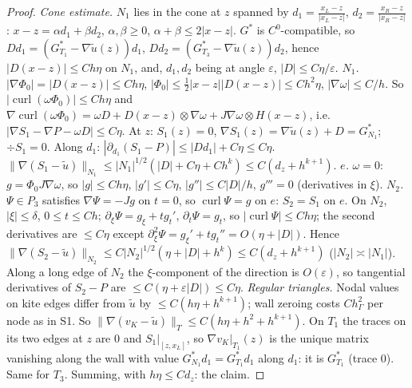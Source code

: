 \documentclass[11pt]{article}
\theoremstyle{remark}
\newcommand{\hG}{h_\Gamma}
\newcommand{\norm}[1]{\|#1\|}
\newcommand{\curl}{\operatorname{curl}}
\begin{document}
\begin{proof}
\emph{Cone estimate.} $N_1$ lies in the cone at $z$ spanned by $d_1=\frac{x_L-z}{|x_L-z|}$, $d_2=\frac{x_R-z}{|x_R-z|}$: $x-z=\alpha d_1+\beta d_2$, $\alpha,\beta\ge0$, $\alpha+\beta\le2|x-z|$.
$G^*$ is $C^0$-compatible, so $Dd_1=(G^*_{T_1}-\nabla\tilde u(z))d_1$, $Dd_2=(G^*_{T_3}-\nabla\tilde u(z))d_2$, hence $|D(x-z)|\le Ch\eta$ on $N_1$, and, $d_1,d_2$ being at angle
$\varepsilon$, $|D|\le C\eta/\varepsilon$.
\emph{$N_1$.} $|\nabla\Phi_0|=|D(x-z)|\le Ch\eta$, $|\Phi_0|\le\frac12|x-z||D(x-z)|\le Ch^2\eta$, $|\nabla\omega|\le C/h$. So
$|\curl(\omega\Phi_0)|\le Ch\eta$ and $\nabla\curl(\omega\Phi_0)=\omega D+D(x-z)\otimes\nabla\omega+J\nabla\omega\otimes H(x-z)$, i.e. $|\nabla S_1-\nabla P-\omega D|\le C\eta$.
At $z$: $S_1(z)=0$, $\nabla S_1(z)=\nabla\tilde u(z)+D=G^*_{N_1}$; $\div S_1=0$. Along $d_1$: $|\partial_{d_1}(S_1-P)|\le|Dd_1|+C\eta\le C\eta$.
$\norm{\nabla(S_1-\tilde u)}_{N_1}\le|N_1|^{1/2}(|D|+C\eta+Ch^k)\le C(d_z+h^{k+1})$.
\emph{$e$.} $\omega=0$: $g=\Phi_0J\nabla\omega$, so $|g|\le Ch\eta$, $|g'|\le C\eta$, $|g''|\le C|D|/h$, $g'''=0$ (derivatives in $\xi$).
\emph{$N_2$.} $\Psi\in P_3$ satisfies $\nabla\Psi=-Jg$ on $t=0$, so $\curl\Psi=g$ on $e$: $S_2=S_1$ on $e$. On $N_2$, $|\xi|\le\delta$, $0\le t\le Ch$; $\partial_\xi\Psi=g_\xi+tg_t'$,
$\partial_t\Psi=g_t$, so $|\curl\Psi|\le Ch\eta$; the second derivatives are $\le C\eta$ except $\partial_\xi^2\Psi=g_\xi'+tg_t''=O(\eta+|D|)$. Hence
$\norm{\nabla(S_2-\tilde u)}_{N_2}\le C|N_2|^{1/2}(\eta+|D|+h^k)\le C(d_z+h^{k+1})$ ($|N_2|\asymp|N_1|$). Along a long edge of $N_2$ the $\xi$-component of the
direction is $O(\varepsilon)$, so tangential derivatives of $S_2-P$ are $\le C(\eta+\varepsilon|D|)\le C\eta$.
\emph{Regular triangles.} Nodal values on kite edges differ from $\tilde u$ by $\le C(h\eta+h^{k+1})$; wall zeroing costs $C\hG^2$ per node as in S1. So
$\norm{\nabla(v_K-\tilde u)}_T\le C(h\eta+h^2+h^{k+1})$. On $T_1$ the traces on its two edges at $z$ are $0$ and $S_1|_{[z,x_L]}$, so
$\nabla v_K|_{T_1}(z)$ is the unique matrix vanishing along the wall with value $G^*_{N_1}d_1=G^*_{T_1}d_1$ along $d_1$: it is $G^*_{T_1}$ (trace $0$). Same for $T_3$.
Summing, with $h\eta\le Cd_z$: the claim.
\end{proof}
\end{document}
